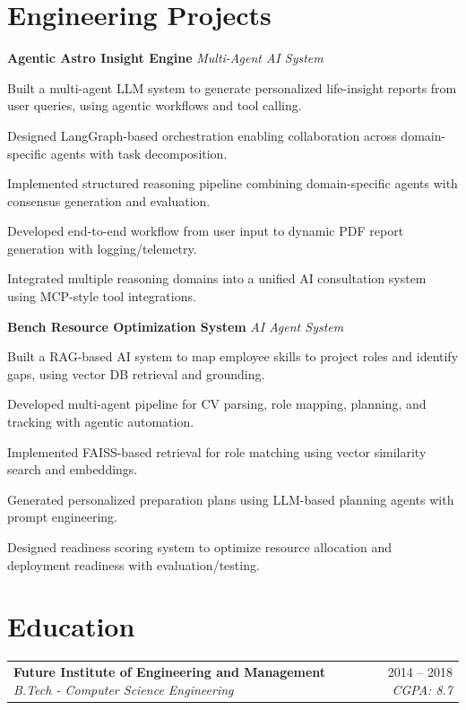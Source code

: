 \documentclass[10pt, letterpaper]{article}
\makeatletter
\newcommand{\resumeitem}[1]{\item\small{#1}}
\newcommand{\jobheading}[4]{%
  \noindent
  \begin{tabularx}{\textwidth}{@{}X r@{}}
    \textbf{\color{primary}#1} \textbar{} \textit{\small\color{subtle}#2} &
    \small\color{subtle}#3 \textbar{} \textit{\small #4}
  \end{tabularx}%
}
\makeatother
\begin{document}
\section{Engineering Projects}

\noindent\textbf{Agentic Astro Insight Engine} \textemdash{} \textit{Multi-Agent AI System}

\begin{projectitems}
\resumeitem{Built a multi-agent LLM system to generate personalized life-insight reports from user queries, using agentic workflows and tool calling.}
\resumeitem{Designed LangGraph-based orchestration enabling collaboration across domain-specific agents with task decomposition.}
\resumeitem{Implemented structured reasoning pipeline combining domain-specific agents with consensus generation and evaluation.}
\resumeitem{Developed end-to-end workflow from user input to dynamic PDF report generation with logging/telemetry.}
\resumeitem{Integrated multiple reasoning domains into a unified AI consultation system using MCP-style tool integrations.}
\end{projectitems}

\noindent\textbf{Bench Resource Optimization System} \textemdash{} \textit{AI Agent System}

\begin{projectitems}
\resumeitem{Built a RAG-based AI system to map employee skills to project roles and identify gaps, using vector DB retrieval and grounding.}
\resumeitem{Developed multi-agent pipeline for CV parsing, role mapping, planning, and tracking with agentic automation.}
\resumeitem{Implemented FAISS-based retrieval for role matching using vector similarity search and embeddings.}
\resumeitem{Generated personalized preparation plans using LLM-based planning agents with prompt engineering.}
\resumeitem{Designed readiness scoring system to optimize resource allocation and deployment readiness with evaluation/testing.}
\end{projectitems}

\section{Education}

\jobheading{Future Institute of Engineering and Management}{B.Tech - Computer Science Engineering}{2014 -- 2018}{CGPA: 8.7}
\end{document}
